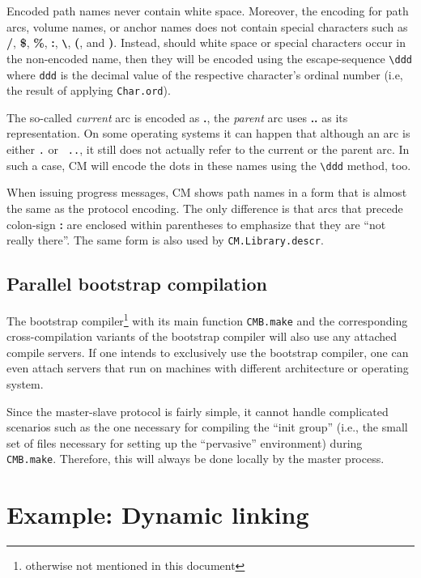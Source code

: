 \documentclass[titlepage,letterpaper]{article}
\begin{document}
Encoded path names never contain white space.  Moreover, the encoding
for path arcs, volume names, or anchor names does not contain special
characters such as {\bf /}, {\bf \$}, {\bf \%}, {\bf :}, {\bf
\verb|\|}, {\bf (}, and {\bf )}.  Instead, should white space or
special characters occur in the non-encoded name, then they will be
encoded using the escape-sequence \verb|\ddd| where {\tt ddd} is the
decimal value of the respective character's ordinal number (i.e, the
result of applying {\tt Char.ord}).

The so-called {\em current} arc is encoded as {\bf .}, the {\em
parent} arc uses {\bf ..} as its representation.  On some operating
systems it can happen that although an arc is either {\tt .} or {\tt
..}, it still does not actually refer to the current or the parent
arc.  In such a case, CM will encode the dots in these names using the
\verb|\ddd| method, too.

When issuing progress messages, CM shows path names in a form that is
almost the same as the protocol encoding.  The only difference is that
arcs that precede colon-sign {\bf :} are enclosed within parentheses
to emphasize that they are ``not really there''.  The same form is
also used by {\tt CM.Library.descr}.

\subsection{Parallel bootstrap compilation}

The bootstrap compiler\footnote{otherwise not mentioned in this
document} with its main function {\tt CMB.make} and the corresponding
cross-compilation variants of the bootstrap compiler will also use any
attached compile servers.  If one intends to exclusively use the
bootstrap compiler, one can even attach servers that run on machines
with different architecture or operating system.

Since the master-slave protocol is fairly simple, it cannot handle
complicated scenarios such as the one necessary for compiling the
``init group'' (i.e., the small set of files necessary for setting up
the ``pervasive'' environment) during {\tt CMB.make}.  Therefore, this
will always be done locally by the master process.

\section{Example: Dynamic linking}
\label{sec:dynlink}
\end{document}

